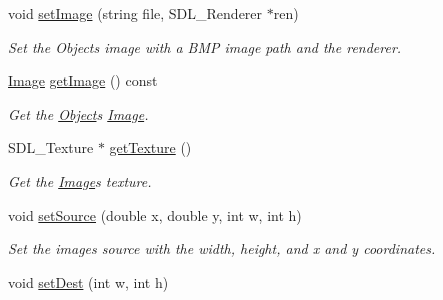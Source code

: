 \begin{DoxyCompactItemize}
\item 
void \hyperlink{classObject_a7f984ff2fb0c60b942a1018fc48417ae}{set\+Image} (string file, S\+D\+L\+\_\+\+Renderer $\ast$ren)\hypertarget{classObject_a7f984ff2fb0c60b942a1018fc48417ae}{}\label{classObject_a7f984ff2fb0c60b942a1018fc48417ae}

\begin{DoxyCompactList}\small\item\em Set the Objects image with a B\+MP image path and the renderer. \end{DoxyCompactList}\item 
\hyperlink{classImage}{Image} \hyperlink{classObject_a76748c591087e0a3c676daea6f257e08}{get\+Image} () const \hypertarget{classObject_a76748c591087e0a3c676daea6f257e08}{}\label{classObject_a76748c591087e0a3c676daea6f257e08}

\begin{DoxyCompactList}\small\item\em Get the \hyperlink{classObject}{Object}\textquotesingle{}s \hyperlink{classImage}{Image}. \end{DoxyCompactList}\item 
S\+D\+L\+\_\+\+Texture $\ast$ \hyperlink{classObject_af8ae0f74940285c54e90f19027bba3a7}{get\+Texture} ()\hypertarget{classObject_af8ae0f74940285c54e90f19027bba3a7}{}\label{classObject_af8ae0f74940285c54e90f19027bba3a7}

\begin{DoxyCompactList}\small\item\em Get the \hyperlink{classImage}{Image}\textquotesingle{}s texture. \end{DoxyCompactList}\item 
void \hyperlink{classObject_a094e6dc25b31cfac9d745869a878bd8b}{set\+Source} (double x, double y, int w, int h)\hypertarget{classObject_a094e6dc25b31cfac9d745869a878bd8b}{}\label{classObject_a094e6dc25b31cfac9d745869a878bd8b}

\begin{DoxyCompactList}\small\item\em Set the images source with the width, height, and x and y coordinates. \end{DoxyCompactList}\item 
void \hyperlink{classObject_a0ba46a30886b3d30e2b9a8a263b6c9b9}{set\+Dest} (int w, int h)\hypertarget{classObject_a0ba46a30886b3d30e2b9a8a263b6c9b9}{}\label{classObject_a0ba46a30886b3d30e2b9a8a263b6c9b9}


\end{DoxyCompactItemize}

